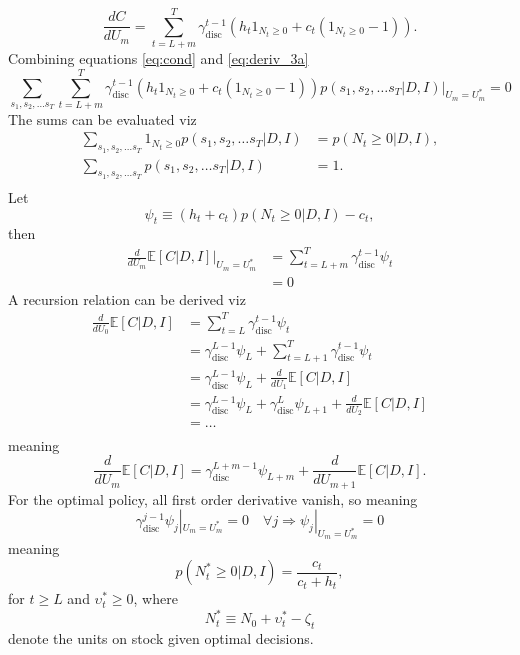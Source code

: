 \begin{equation}
	\frac{dC}{dU_m} = \sum_{t=L+m}^{T}\gamma_{\text{disc}}^{t-1}(h_t1_{N_t\geq 0}+c_t(1_{N_t\geq 0}-1)).
	\label{eq:deriv_3a}
\end{equation}
Combining equations \eqref{eq:cond} and \eqref{eq:deriv_3a}
\begin{equation}
	\sum_{s_1,s_2,\dots s_T}\sum_{t=L+m}^{T}\gamma_{\text{disc}}^{t-1}(h_t1_{N_{t}\geq 0}+c_t(1_{N_{t}\geq 0}-1))p(s_1,s_{2},\dots s_T|D,I)\Big|_{U_m=U_m^*} = 0
\end{equation}
The sums can be evaluated viz
\begin{equation}
	\begin{split}
		\sum_{s_1,s_2,\dots s_T}1_{N_{t}\geq 0}p(s_1,s_{2},\dots s_T|D,I) &= p(N_t\geq 0|D,I),\\
		\sum_{s_1,s_2,\dots s_T}p(s_1,s_{2},\dots s_T|D,I)&=1.\\
	\end{split}
\end{equation}
Let
\begin{equation}
	\psi_t\equiv (h_t+c_t)p(N_t\geq 0|D,I)-c_t,
\end{equation} 
then
\begin{equation}
	\begin{split}
		\frac{d}{dU_m}\mathbb{E}[C|D,I]\Big|_{U_m=U_m^*}& = \sum_{t=L+m}^{T}\gamma_{\text{disc}}^{t-1}\psi_t\\
		&= 0
	\end{split}
\end{equation}
A recursion relation can be derived viz
\begin{equation}
	\begin{split}
		\frac{d}{dU_0}\mathbb{E}[C|D,I]& = \sum_{t=L}^{T}\gamma_{\text{disc}}^{t-1}\psi_t\\
		& =\gamma_{\text{disc}}^{L-1}\psi_L+\sum_{t=L+1}^{T}\gamma_{\text{disc}}^{t-1}\psi_t\\
		& =\gamma_{\text{disc}}^{L-1}\psi_L+\frac{d}{dU_1}\mathbb{E}[C|D,I]\\
		& =\gamma_{\text{disc}}^{L-1}\psi_L+\gamma_{\text{disc}}^{L}\psi_{L+1}+\frac{d}{dU_2}\mathbb{E}[C|D,I]\\
		&=\dots\\
	\end{split} 
\end{equation}
meaning
\begin{equation}
		\frac{d}{dU_m}\mathbb{E}[C|D,I] =\gamma_{\text{disc}}^{L+m-1}\psi_{L+m}+\frac{d}{dU_{m+1}}\mathbb{E}[C|D,I]. 
\end{equation}
For the optimal policy, all first order derivative vanish, so meaning
\begin{equation}
	\gamma_{\text{disc}}^{j-1}\psi_j|_{U_m=U_m^*}= 0\quad \forall j \Rightarrow \psi_j|_{U_m=U_m^*}=0
\end{equation}
meaning
\begin{equation}
	p(N_t^*\geq 0|D,I)=\frac{c_t}{c_t+h_t},
	\label{decision_rules}
\end{equation}
for $t\geq L$ and $\upsilon_t^*\geq 0$, where
\begin{equation}
	N_t^*\equiv N_0+\upsilon_t^*-\zeta_t
\end{equation}
denote the units on stock given optimal decisions.
